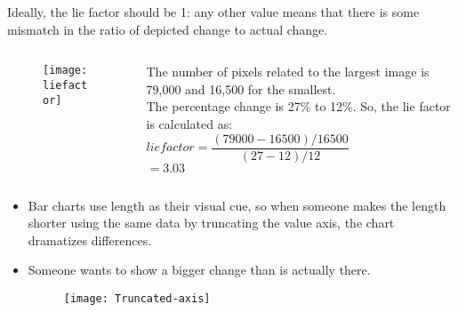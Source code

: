 \documentclass[12pt]{beamer}
\begin{document}
    \begin{frame}{}		 
    		 Ideally, the lie factor should be 1: any other value means that there is some mismatch in the ratio of depicted change to actual change.
    		\begin{columns}
    			\begin{column}{0.4\textwidth}
    				\begin{figure}
    					\centering
    					\texttt{[image: liefactor]}
    				\end{figure}
    			\end{column}
    		\begin{column}{0.6\textwidth}
    				 The number of pixels related to the largest image is 79,000 and 16,500 for the smallest. 
    				 \\
    				 \vspace{0.1cm}
    				 The percentage change is 27\% to 12\%. So, the lie factor is calculated as:
    				\\
    				\vspace{0.5cm}
    				$lie factor = \dfrac{(79000 - 16500)/16500}{(27 - 12)/12}$
    				\\ 
    				\vspace{0.5cm}
    				\centering $= 3.03$
    		\end{column}
    		\end{columns}
    \end{frame}
    \begin{frame}{}
    	\begin{itemize}
    		\item Bar charts use length as their visual cue, so when someone makes the length shorter using the same data by truncating the value axis, the chart dramatizes differences. 
    		\item Someone wants to show a bigger change than is actually there.
    		\begin{figure}
    			\centering
    			\texttt{[image: Truncated-axis]}
    		\end{figure}
    	\end{itemize}
    \end{frame}
\end{document}
